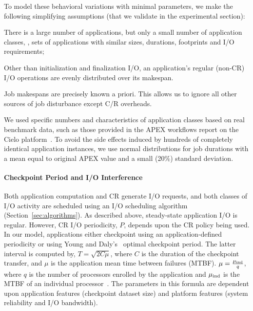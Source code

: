 To model these behavioral variations with minimal parameters, we make the following
simplifying assumptions (that we validate in the experimental section):
\begin{compactitem}
\item There is a large number of applications, but only a small number of application
  classes, \ie, sets of applications with similar sizes, durations, footprints and
  I/O requirements;
\item Other than initialization and finalization I/O, an application's regular
  (non-CR) I/O operations are evenly distributed over its makespan.
\item Job makespans are precisely known a priori. This allows us to ignore all other
  sources of job disturbance except C/R overheads.
\end{compactitem}
We used specific numbers and characteristics of application classes based on real
benchmark data, such as those provided in the APEX workflows report on the Cielo platform~\cite{apex2016}.  To
avoid the side effects induced by hundreds of completely identical application
instances, we use normal distributions for job durations with a mean equal to original
APEX value and a small (20\%) standard deviation.

\paragraph*{Checkpoint Period and I/O Interference}

Both application computation and CR generate I/O requests, and both classes of I/O
activity are scheduled using an I/O scheduling algorithm (Section~\ref{sec:algorithms}). As
described above, steady-state application I/O is regular. However, CR I/O
periodicity, $P$, depends
upon the CR policy being used.  In our model, applications either checkpoint using an
application-defined periodicity or using Young and
Daly's~\cite{young74,daly04} optimal checkpoint period. The latter interval is
computed by, $T=\sqrt{2 C \mu}$, where $C$ is the duration of the checkpoint
transfer, and $\mu$ is the application mean time between failures (MTBF).
$\mu = \frac{\mu_{\text{ind}}}{q}$, where $q$ is the number of processors enrolled by the
application and $\mu_{\text{ind}}$ is the MTBF of an individual
processor~\cite{springer-monograph}.  The parameters in this formula are dependent
upon application features (checkpoint dataset size) and platform features (system
reliability and I/O bandwidth).

